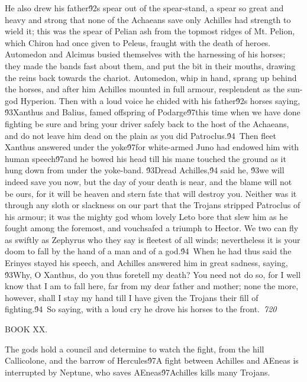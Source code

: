 {He also drew his father\'92s spear out of the spear-stand, a spear so great and heavy and strong that none of the Achaeans save only Achilles had strength to wield it; this was the spear of Pelian ash from the topmost ridges of Mt. Pelion, which Chiron had once given to Peleus, fraught with the death of heroes. Automedon and Alcimus busied themselves with the harnessing of his horses; they made the bands fast about them, and put the bit in their mouths, drawing the reins back towards the chariot. Automedon, whip in hand, sprang up behind the horses, and after him Achilles mounted in full armour, resplendent as the sun-god Hyperion. Then with a loud voice he chided with his father\'92s horses saying, \'93Xanthus and Balius, famed offspring of Podarge\'97this time when we have done fighting be sure and bring your driver safely back to the host of the Achaeans, and do not leave him dead on the plain as you did Patroclus.\'94\
Then fleet Xanthus answered under the yoke\'97for white-armed Juno had endowed him with human speech\'97and he bowed his head till his mane touched the ground as it hung down from under the yoke-band. \'93Dread Achilles,\'94 said he, \'93we will indeed save you now, but the day of your death is near, and the blame will not be ours, for it will be heaven and stern fate that will destroy you. Neither was it through any sloth or slackness on our part that the Trojans stripped Patroclus of his armour; it was the mighty god whom lovely Leto bore that slew him as he fought among the foremost, and vouchsafed a triumph to Hector. We two can fly as swiftly as Zephyrus who they say is fleetest of all winds; nevertheless it is your doom to fall by the hand of a man and of a god.\'94\
When he had thus said the Erinyes stayed his speech, and Achilles answered him in great sadness, saying, \'93Why, O Xanthus, do you thus foretell my death? You need not do so, for I well know that I am to fall here, far from my dear father and mother; none the more, however, shall I stay my hand till I have given the Trojans their fill of fighting.\'94\
So saying, with a loud cry he drove his horses to the front.\
\pard{}\sl720\qc{}

\fs48  BOOK XX.\
\pard{}\li1710\ri1710\sa64\qj\partightenfactor0

\fs25\fsmilli12800 \cf2 The gods hold a council and determine to watch the fight, from the hill Callicolone, and the barrow of Hercules\'97A fight between Achilles and AEneas is interrupted by Neptune, who saves AEneas\'97Achilles kills many Trojans.\
\pard\pardeftab720\qj{}

}
